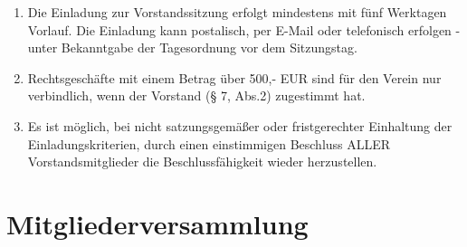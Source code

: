 \begin{enumerate}
  \item Die Einladung zur Vorstandssitzung erfolgt mindestens mit fünf Werktagen Vorlauf. Die Einladung kann postalisch, per E-Mail oder telefonisch erfolgen - unter Bekanntgabe der Tagesordnung vor dem Sitzungstag.
  \item Rechtsgeschäfte mit einem Betrag über 500,- EUR sind für den Verein nur verbindlich, wenn der Vorstand (§ 7, Abs.2) zugestimmt hat.
  \item Es ist möglich, bei nicht satzungsgemäßer oder fristgerechter Einhaltung der Einladungskriterien, durch einen einstimmigen Beschluss ALLER Vorstandsmitglieder die Beschlussfähigkeit wieder herzustellen.
\end{enumerate}

\section{Mitgliederversammlung}
